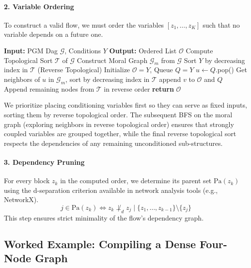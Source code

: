 \paragraph{2. Variable Ordering}
To construct a valid flow, we must order the variables $[z_1, \dots, z_K]$ such that no variable depends on a future one.
\begin{algorithm}[H]
\caption{Variable Ordering Scheme}
\begin{algorithmic}
\STATE \textbf{Input:} PGM Dag $\mathcal{G}$, Conditions $Y$
\STATE \textbf{Output:} Ordered List $\mathcal{O}$
\STATE Compute Topological Sort $\mathcal{T}$ of $\mathcal{G}$
\STATE Construct Moral Graph $\mathcal{G}_m$ from $\mathcal{G}$
\STATE Sort $Y$ by decreasing index in $\mathcal{T}$ (Reverse Topological)
\STATE Initialize $\mathcal{O} = Y$, Queue $Q = Y$
    \STATE $u \gets Q$.pop()
    \STATE Get neighbors of $u$ in $\mathcal{G}_m$, sort by decreasing index in $\mathcal{T}$
            \STATE append $v$ to $\mathcal{O}$ and $Q$
        \ENDIF
    \ENDFOR
\ENDWHILE
\STATE Append remaining nodes from $\mathcal{T}$ in reverse order
\STATE \textbf{return} $\mathcal{O}$
\end{algorithmic}
\end{algorithm}
We prioritize placing conditioning variables first so they can serve as fixed inputs, sorting them by reverse topological order. The subsequent BFS on the moral graph (exploring neighbors in reverse topological order) ensures that strongly coupled variables are grouped together, while the final reverse topological sort respects the dependencies of any remaining unconditioned sub-structures.

\paragraph{3. Dependency Pruning}
For every block $z_k$ in the computed order, we determine its parent set $\text{Pa}(z_k)$ using the d-separation criterion available in network analysis tools (e.g., NetworkX).
\begin{equation}
    j \in \text{Pa}(z_k) \iff z_k \not\perp_{d} z_j \mid \{z_1, \dots, z_{k-1}\} \setminus \{z_j\}
\end{equation}
This step ensures strict minimality of the flow's dependency graph.

\subsection{Worked Example: Compiling a Dense Four-Node Graph}
\label{app:worked-example}

